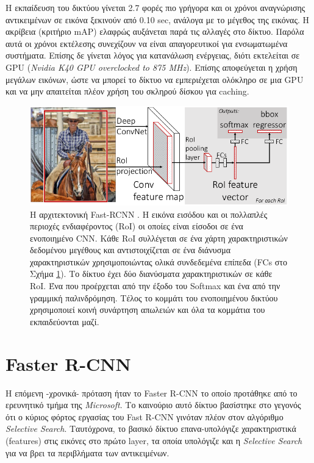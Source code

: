 Η εκπαίδευση του δικτύου γίνεται 2.7 φορές πιο γρήγορα και οι χρόνοι αναγνώρισης αντικειμένων σε εικόνα ξεκινούν από 0.10 sec, ανάλογα με το μέγεθος της εικόνας. Η ακρίβεια (κριτήριο mAP) ελαφρώς αυξάνεται παρά τις αλλαγές στο δίκτυο.
Παρόλα αυτά οι χρόνοι εκτέλεσης συνεχίζουν να είναι απαγορευτικοί για ενσωματωμένα συστήματα. Επίσης δε γίνεται λόγος για κατανάλωση ενέργειας, διότι εκτελείται σε GPU (\textit{Nvidia K40 GPU overclocked to 875 MHz}). Επίσης αποφεύγεται η χρήση μεγάλων εικόνων, ώστε να μπορεί το δίκτυο να εμπεριέχεται ολόκληρο σε μια GPU και να μην απαιτείται πλέον χρήση του σκληρού δίσκου για caching. 

\begin{figure}
\centering
\includegraphics[width = \textwidth]{figures/RCNN/Fast-RCNN_architecture.png}
\caption[Αρχιτεκτονική Fast-RCNN]{Η αρχιτεκτονική Fast-RCNN \cite{11}. Η εικόνα εισόδου και οι πολλαπλές περιοχές ενδιαφέροντος (RoI) οι οποίες είναι είσοδοι σε ένα ενοποιημένο CNN. Κάθε RoI συλλέγεται σε ένα χάρτη χαρακτηριστικών δεδομένου μεγέθους και αντιστοιχίζεται σε ένα διάνυσμα χαρακτηριστικών χρησιμοποιώντας ολικά συνδεδεμένα επίπεδα (FCs στο Σχήμα \ref{fig:Fast_RCNN_architecture}). Το δίκτυο έχει δύο διανύσματα χαρακτηριστικών σε κάθε RoI. Ένα που προέρχεται από την έξοδο του Softmax και ένα από την γραμμική παλινδρόμηση. Τέλος το κομμάτι του ενοποιημένου δικτύου χρησιμοποιεί κοινή συνάρτηση απωλειών και όλα τα κομμάτια του εκπαιδεύονται μαζί.}
\label{fig:Fast_RCNN_architecture}
\end{figure}


\section{Faster R-CNN \cite{12}}
Η επόμενη -χρονικά- πρόταση ήταν το Faster R-CNN το οποίο προτάθηκε από το ερευνητικό τμήμα της \textit{Microsoft}. Το καινούριο αυτό δίκτυο βασίστηκε στο γεγονός ότι ο κύριος φόρτος εργασίας του Fast R-CNN γινόταν πλέον στον αλγόριθμο \textit{Selective Search}. Ταυτόχρονα, το βασικό δίκτυο επανα-υπολόγιζε χαρακτηριστικά (features) στις εικόνες στο πρώτο layer, τα οποία υπολόγιζε και η \textit{Selective Search} για να βρει τα περιβλήματα των αντικειμένων.

